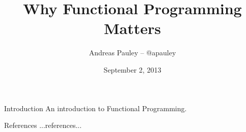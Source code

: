 \documentclass{beamer}
\title[Functional Programming]{Why Functional Programming Matters}
\author{Andreas Pauley -- @apauley}
\institute{Pattern Matched Technologies/Lambda Luminaries}
\date{September 2, 2013}
\begin{document}
\begin{frame}
\titlepage
\end{frame}


\begin{frame}{Introduction}
An introduction to Functional Programming.
\end{frame}

\begin{frame}{References}
...references...
\end{frame}
\end{document}
